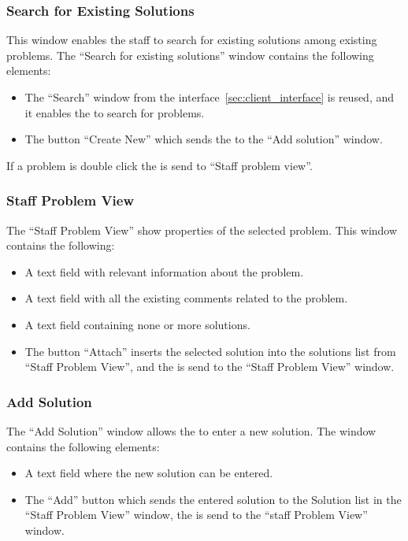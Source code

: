 \subsubsection{Search for Existing Solutions}
This window enables the staff to search for existing solutions among existing problems. The ``Search for existing solutions'' window contains the following elements:
\begin{itemize}
	\item The ``Search'' window from the \aclient[] interface~\ref{sec:client_interface} is reused, and it enables the \astaff[] to search for problems.
	\item The button ``Create New'' which sends the \astaff to the ``Add solution'' window.
\end{itemize} 
If a problem is double click the \astaff[] is send to ``Staff problem view''.

\subsubsection{Staff Problem View}
The ``Staff Problem View'' show properties of the selected problem. This window contains the following:
\begin{itemize}
	\item A text field with relevant information about the problem.
	\item A text field with all the existing comments related to the problem.
	\item A text field containing none or more solutions.
	\item The button ``Attach'' inserts the selected solution into the solutions list from ``Staff Problem View'', and the \astaff[] is send to the ``Staff Problem View'' window.
\end{itemize}

\subsubsection{Add Solution}
The ``Add Solution'' window allows the \staff[] to enter a new solution. The window contains the following elements:
\begin{itemize}
	\item A text field where the new solution can be entered.
	\item The ``Add'' button which sends the entered solution to the Solution list in the ``Staff Problem View'' window, the \astaff is send to the ``staff Problem View'' window.
\end{itemize}
 


